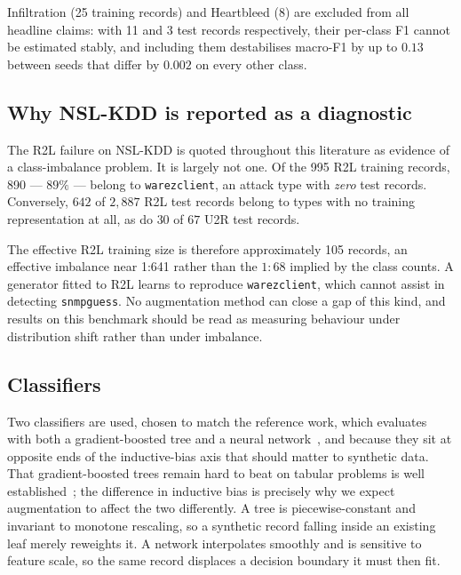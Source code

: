 \documentclass[11pt]{article}
\newcommand{\rtwolTrain}{995}
\newcommand{\warezTrain}{890}
\newcommand{\rtwolEffective}{105}
\newcommand{\rtwolEffectiveRatio}{1{:}641}
\begin{document}


Infiltration (25 training records) and Heartbleed (8) are excluded from all
headline claims: with 11 and 3 test records respectively, their per-class F1 cannot
be estimated stably, and including them destabilises macro-F1 by up to $0.13$
between seeds that differ by $0.002$ on every other class.

\subsection*{Why NSL-KDD is reported as a diagnostic}

The R2L failure on NSL-KDD is quoted throughout this literature as evidence of a
class-imbalance problem. It is largely not one. Of the \rtwolTrain{} R2L training
records, \warezTrain{} --- $89\%$ --- belong to \texttt{warezclient}, an attack type
with \emph{zero} test records. Conversely, $642$ of $2{,}887$ R2L test records
belong to types with no training representation at all, as do $30$ of $67$ U2R test
records.

The effective R2L training size is therefore approximately \rtwolEffective{}
records, an effective imbalance near \rtwolEffectiveRatio{} rather than the
$1{:}68$ implied by the class counts. A generator fitted to R2L learns to reproduce
\texttt{warezclient}, which cannot assist in detecting \texttt{snmpguess}. No
augmentation method can close a gap of this kind, and results on this benchmark
should be read as measuring behaviour under distribution shift rather than under
imbalance.

\subsection*{Classifiers}

Two classifiers are used, chosen to match the reference work, which evaluates with
both a gradient-boosted tree and a neural network~\cite{alsubaei2025smart}, and
because they sit at opposite ends of the inductive-bias axis that should matter to synthetic data. That gradient-boosted trees remain hard to beat on tabular problems is well established~\cite{grinsztajn2022why}; the difference in inductive bias is precisely why we expect augmentation to affect the two differently. A tree is piecewise-constant and invariant to monotone rescaling, so
a synthetic record falling inside an existing leaf merely reweights it. A network
interpolates smoothly and is sensitive to feature scale, so the same record displaces
a decision boundary it must then fit.
\end{document}
